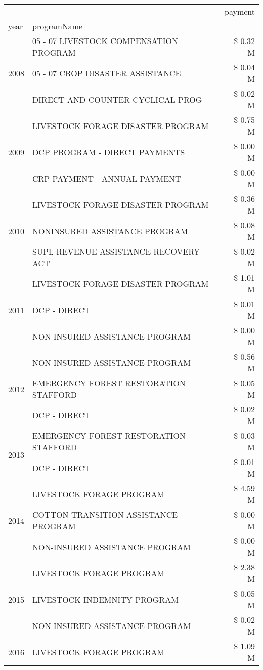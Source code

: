 \begin{tabular}{llr}
\toprule
 &  & payment \\
year & programName &  \\
\midrule
\multirow[t]{3}{*}{2008} & 05 - 07 LIVESTOCK COMPENSATION PROGRAM & \$ 0.32 M \\
 & 05 - 07 CROP DISASTER ASSISTANCE & \$ 0.04 M \\
 & DIRECT AND COUNTER CYCLICAL PROG & \$ 0.02 M \\
\cline{1-3}
\multirow[t]{3}{*}{2009} & LIVESTOCK FORAGE DISASTER  PROGRAM & \$ 0.75 M \\
 & DCP PROGRAM - DIRECT PAYMENTS & \$ 0.00 M \\
 & CRP PAYMENT - ANNUAL PAYMENT & \$ 0.00 M \\
\cline{1-3}
\multirow[t]{3}{*}{2010} & LIVESTOCK FORAGE DISASTER  PROGRAM & \$ 0.36 M \\
 & NONINSURED ASSISTANCE PROGRAM & \$ 0.08 M \\
 & SUPL REVENUE ASSISTANCE RECOVERY ACT & \$ 0.02 M \\
\cline{1-3}
\multirow[t]{3}{*}{2011} & LIVESTOCK FORAGE DISASTER PROGRAM & \$ 1.01 M \\
 & DCP - DIRECT & \$ 0.01 M \\
 & NON-INSURED ASSISTANCE PROGRAM & \$ 0.00 M \\
\cline{1-3}
\multirow[t]{3}{*}{2012} & NON-INSURED ASSISTANCE PROGRAM & \$ 0.56 M \\
 & EMERGENCY FOREST RESTORATION STAFFORD & \$ 0.05 M \\
 & DCP - DIRECT & \$ 0.02 M \\
\cline{1-3}
\multirow[t]{2}{*}{2013} & EMERGENCY FOREST RESTORATION STAFFORD & \$ 0.03 M \\
 & DCP - DIRECT & \$ 0.01 M \\
\cline{1-3}
\multirow[t]{3}{*}{2014} & LIVESTOCK FORAGE PROGRAM & \$ 4.59 M \\
 & COTTON TRANSITION ASSISTANCE PROGRAM & \$ 0.00 M \\
 & NON-INSURED ASSISTANCE PROGRAM & \$ 0.00 M \\
\cline{1-3}
\multirow[t]{3}{*}{2015} & LIVESTOCK FORAGE PROGRAM & \$ 2.38 M \\
 & LIVESTOCK INDEMNITY PROGRAM & \$ 0.05 M \\
 & NON-INSURED ASSISTANCE PROGRAM & \$ 0.02 M \\
\cline{1-3}
\multirow[t]{3}{*}{2016} & LIVESTOCK FORAGE PROGRAM & \$ 1.09 M \\

\end{tabular}
